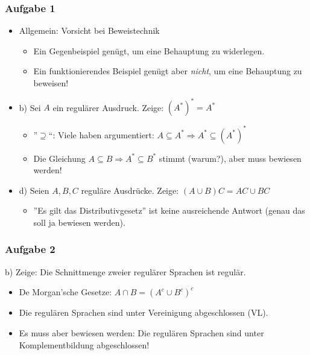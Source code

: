 \begin{frame}
	\frametitle{Aufgabe 1}		
		\begin{itemize}
			\item Allgemein: Vorsicht bei Beweistechnik
			\begin{itemize}
				\item Ein Gegenbeispiel genügt, um eine Behauptung zu widerlegen.
				\item Ein funktionierendes Beispiel genügt aber \emph{nicht}, um eine Behauptung zu beweisen!
			\end{itemize}
			
			\pause			
			
			\item b) Sei $A$ ein regulärer Ausdruck. Zeige: $(A^*)^* = A^*$
			\begin{itemize}
				\item ''$\supseteq$``: Viele haben argumentiert: $ A \subseteq A^* \Rightarrow A^* \subseteq (A^*)^* $
				\item Die Gleichung $A \subseteq B \Rightarrow A^* \subseteq B^*$ stimmt (warum?), aber muss bewiesen werden!
			\end{itemize}
			
			\pause			
			
			\item d) Seien $A, B, C$ reguläre Ausdrücke. Zeige: $(A \cup B) C = AC \cup BC$ 
			\begin{itemize}
				\item ''Es gilt das Distributivgesetz'' ist keine ausreichende Antwort (genau das soll ja bewiesen werden).
			\end{itemize}
		\end{itemize}
	
\end{frame}
\begin{frame}
	
	\frametitle{Aufgabe 2}
		b) Zeige: Die Schnittmenge zweier regulärer Sprachen ist regulär.
		
		\begin{itemize}
			\item De Morgan'sche Gesetze: $A \cap B = (A^c \cup B^c)^c$ 
			\item Die regulären Sprachen sind unter Vereinigung abgeschlossen (VL).
			\item Es muss aber bewiesen werden: Die regulären Sprachen sind unter Komplementbildung abgeschlossen!
		\end{itemize}
\end{frame}

